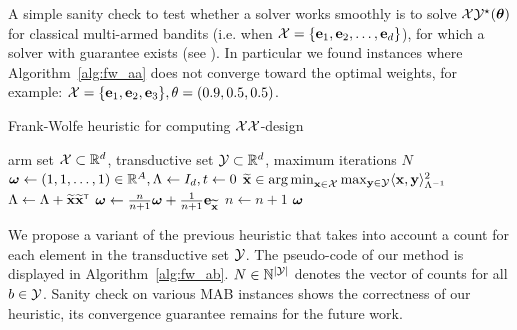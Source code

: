 A simple sanity check to test whether a solver works smoothly is  to solve $\mathcal{X}\mathcal{Y}^\star({\boldsymbol \theta})$ for classical multi-armed bandits (i.e. when $\mathcal{X}= \{{\bf e}_1,{\bf e}_2,\ldots,{\bf e}_d\}$), for which a solver with guarantee exists (see \citealt{garivier2018explore}). In particular we found instances where Algorithm~\ref{alg:fw_aa} does not converge toward the optimal weights, for example: $\mathcal{X}= \{{\bf e}_1,{\bf e}_2,{\bf e}_3\}, \theta = (0.9, 0.5, 0.5)$.



\begin{algorithm}[ht]
\centering
\caption{Frank-Wolfe heuristic for computing $\mathcal{X}\mathcal{X}$-design}
\label{alg:fw_aa}
\begin{algorithmic}
    arm set $\mathcal{X}\subset\mathbb{R}^d$, transductive set $\mathcal{Y}\subset\mathbb{R}^d$, maximum iterations $N$
    ${\boldsymbol \omega} \leftarrow{} (1, 1, \ldots, 1)\in\mathbb{R}^A, \Lambda \leftarrow{} I_d, t \leftarrow{} 0$
        \State $\widetilde{\bf x}\in\operatorname*{arg\,min}_{{\bf x}\in\mathcal{X}}\max_{{\bf y}\in\mathcal{Y}}\langle {\bf x},{\bf y}\rangle_{\Lambda^{-1}}^2$%
        \State $\Lambda \leftarrow{} \Lambda + \widetilde{\bf x} \widetilde{\bf x}^\mathsf{\scriptscriptstyle T}$
        \State ${\boldsymbol \omega} \leftarrow{} \frac{n}{n+1}{\boldsymbol \omega}+\frac{1}{n+1}{\bf e}_{\widetilde{\bf x}}$
        \State $n \leftarrow{} n+1$
   \EndWhile
    ${\boldsymbol \omega}$
\end{algorithmic}
\end{algorithm}

We propose a variant of the previous heuristic that takes into account a count for each element in the transductive set $\mathcal{Y}$. The pseudo-code of our method is displayed in Algorithm~\ref{alg:fw_ab}. $N\in{\mathbb N}^{|\mathcal{Y}|}$ denotes the vector of counts for all $b\in\mathcal{Y}$. Sanity check on various MAB instances shows the correctness of our heuristic, its convergence guarantee remains for the future work.

